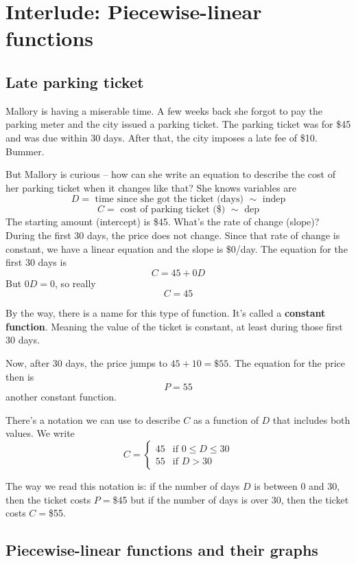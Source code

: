 
\section{Interlude: Piecewise-linear functions} 

\subsection*{Late parking ticket}

Mallory is having a miserable time.  A few weeks back she forgot to pay the parking meter and the city issued a parking ticket.  The parking ticket was for \$45 and was due within 30 days.  After that, the city imposes a late fee of \$10.  Bummer.

But Mallory is curious -- how can she write an equation to describe the cost of her parking ticket when it changes like that? She knows variables are 
$$D = \text{ time since she got the ticket (days) } \sim \text{ indep}$$
$$C = \text{ cost of parking ticket (\$) } \sim \text{ dep}$$
The starting amount (intercept) is \$45.  What's the rate of change (slope)?  During the first 30 days, the price does not change.  Since that rate of change is constant, we have a linear equation and the slope is \$0/day.  The equation for the first 30 days is
$$C = 45 + 0D$$
But $0D = 0$, so really
$$C = 45$$

By the way, there is a name for this type of function. It's called a \textbf{constant function}.  Meaning the value of the ticket is constant, at least during those first 30 days.

Now, after 30 days, the price jumps to $45+10 = \$55$.  The equation for the price then is
$$P = 55$$
another constant function.

There's a notation we can use to describe $C$ as a function of $D$ that includes both values.  We write
    $$C = \left\{ 
        \begin{array} {cl} 
            45 & \text{if } 0 \le D \le 30 \\
            55 & \text{if } D > 30
        \end{array}
    \right.$$

The way we read this notation is: if the number of days $D$ is between 0 and 30, then the ticket costs $P=$\$45 but if the number of days is over 30, then the ticket costs $C=$\$55.

\subsection*{Piecewise-linear functions and their graphs}

